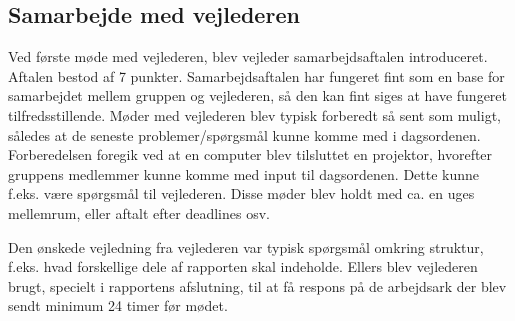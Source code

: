 \subsection{Samarbejde med vejlederen}


Ved første møde med vejlederen, blev vejleder samarbejdsaftalen introduceret. Aftalen bestod af 7 punkter. Samarbejdsaftalen har fungeret fint som en base for samarbejdet mellem gruppen og vejlederen, så den kan fint siges at have fungeret tilfredsstillende. Møder med vejlederen blev typisk forberedt så sent som muligt, således at de seneste problemer/spørgsmål kunne komme med i dagsordenen. Forberedelsen foregik ved at en computer blev tilsluttet en projektor, hvorefter gruppens medlemmer kunne komme med input til dagsordenen. Dette kunne f.eks. være spørgsmål til vejlederen. Disse møder blev holdt med ca. en uges mellemrum, eller aftalt efter deadlines osv.

Den ønskede vejledning fra vejlederen var typisk spørgsmål omkring struktur, f.eks. hvad forskellige dele af rapporten skal indeholde. Ellers blev vejlederen brugt, specielt i rapportens afslutning, til at få respons på de arbejdsark der blev sendt minimum 24 timer før mødet.